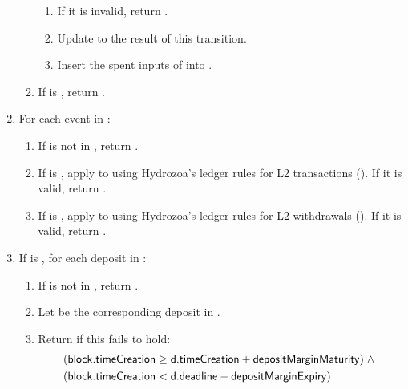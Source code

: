 \documentclass[../hydrozoa.tex]{subfiles}
\begin{document}
\begin{enumerate}
\begin{enumerate}
        \begin{enumerate}
          \item If it is invalid, return .
          \item Update  to the result of this transition.
          \item Insert the spent inputs of  into .
        \end{enumerate}
      \item If  is , return .
    \end{enumerate}
  \item For each event  in :
    \begin{enumerate}
      \item If  is not in , return .
      \item If  is , apply  to  using Hydrozoa's ledger rules for L2 transactions (). If it is valid, return .
      \item If  is , apply  to  using Hydrozoa's ledger rules for L2 withdrawals (). If it is valid, return .
    \end{enumerate}
  \item If  is , for each deposit  in :
    \begin{enumerate}
      \item If  is not in , return .
      \item Let  be the corresponding deposit in .
      \item Return  if this fails to hold:
        \begin{equation*}
        \begin{split}
          &(\mathsf{block.timeCreation} \geq \mathsf{d.timeCreation} + \mathsf{depositMarginMaturity}) \;\land\;\\
          &(\mathsf{block.timeCreation} < \mathsf{d.deadline} - \mathsf{depositMarginExpiry})
        \end{split}
        \end{equation*}

\end{enumerate}
\end{enumerate}
\end{document}
